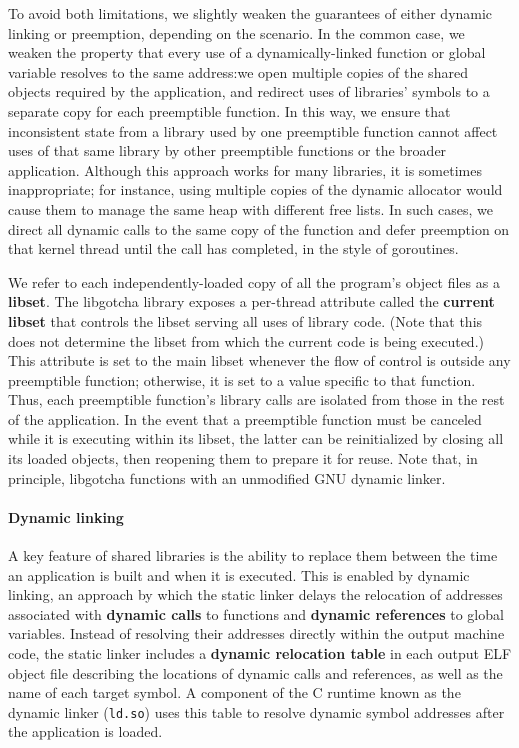To avoid both limitations, we slightly weaken the guarantees of either dynamic
linking or preemption, depending on the scenario.  In the common case, we weaken the
property that every use of a dynamically-linked function or global variable resolves
to the same address:\@ we open multiple copies of the shared objects required by the
application, and redirect uses of libraries' symbols to a separate copy for each
preemptible function.  In this way, we ensure that inconsistent state from a library
used by one preemptible function cannot affect uses of that same library by other
preemptible functions or the broader application.  Although this approach works for
many
libraries, it is sometimes inappropriate; for instance, using multiple copies of the
dynamic allocator would cause them to manage the same heap with different free lists.
In such cases, we direct all dynamic calls to the same copy of the function and defer
preemption on that kernel thread until the call has completed, in the style of
goroutines.

We refer to each independently-loaded copy of all the program's object files as a
\textbf{libset}.  The libgotcha library exposes a per-thread attribute called the
\textbf{current libset} that controls the libset serving all uses of library code.
(Note that this does not determine the libset from which the current code is being
executed.)   This attribute is set to the main libset whenever the flow of control is
outside any preemptible function; otherwise, it is set to a value specific to that
function.  Thus, each preemptible function's library calls are isolated from those in
the rest of the application.  In the event that a preemptible function must be
canceled while it is executing within its libset, the latter can be reinitialized by
closing all its loaded objects, then reopening them to prepare it for reuse.  Note
that, in principle, libgotcha functions with an unmodified GNU dynamic linker.

\paragraph{Dynamic linking}

A key feature of shared libraries is the ability to replace them between the time an
application is built and when it is executed.  This is enabled by dynamic linking, an
approach by which the static linker delays the relocation of addresses associated
with \textbf{dynamic calls} to functions and \textbf{dynamic references} to global
variables.  Instead of resolving their addresses directly within the output machine
code, the static linker includes a
\textbf{dynamic relocation table} in each output ELF object file describing the
locations of dynamic calls and references, as well as the name of each target symbol.
A component of the C runtime known as the dynamic linker (\texttt{ld.so}) uses this
table to resolve dynamic symbol addresses after the application is loaded.

